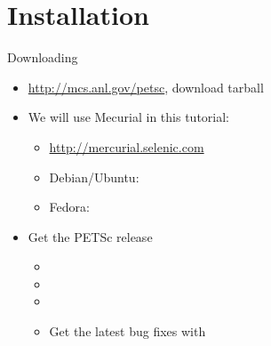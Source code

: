 \section{Installation}
\begin{frame}{Downloading}
\begin{itemize}
  \item \url{http://mcs.anl.gov/petsc}, download tarball
  \item We will use Mecurial in this tutorial:
  \begin{itemize}
    \item \url{http://mercurial.selenic.com}
    \item Debian/Ubuntu: 
    \item Fedora: 
  \end{itemize}
  \item Get the PETSc release
  \begin{itemize}\footnotesize
    \item {}
    \item {}
    \item {}
    \item Get the latest bug fixes with 
  \end{itemize}
\end{itemize}
\end{frame}

